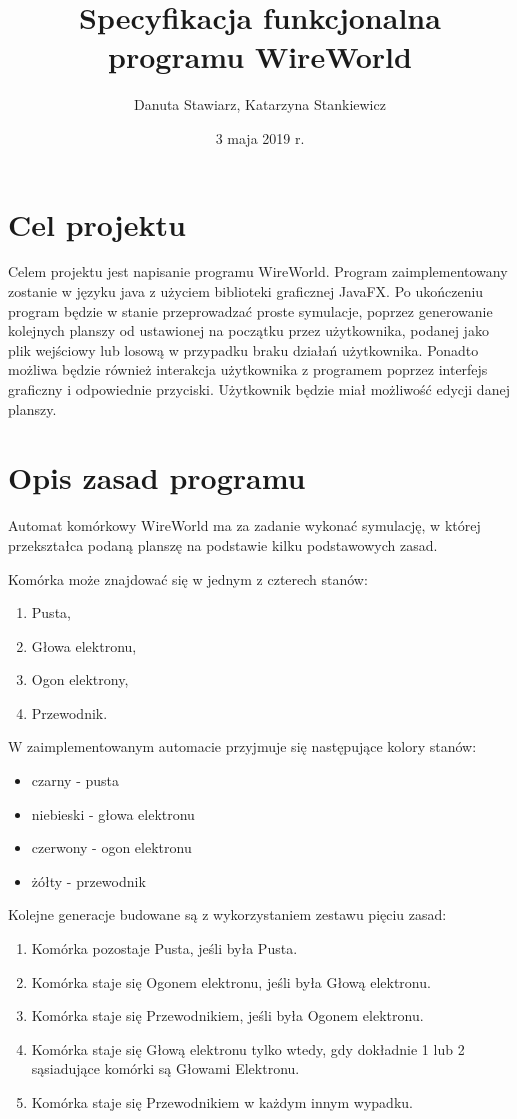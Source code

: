 \documentclass[10pt, oneside]{article}
\title{Specyfikacja funkcjonalna programu WireWorld}
\author{Danuta Stawiarz, Katarzyna Stankiewicz}
\date{3 maja 2019 r.}
\begin{document}
\maketitle
\tableofcontents
\newpage	

\section{Cel projektu}

Celem projektu jest napisanie programu WireWorld. Program zaimplementowany zostanie w języku java z użyciem biblioteki graficznej JavaFX. Po ukończeniu program będzie w stanie przeprowadzać proste symulacje, poprzez generowanie kolejnych planszy od ustawionej na początku przez użytkownika, podanej jako plik wejściowy lub losową w przypadku braku działań użytkownika. Ponadto możliwa będzie również interakcja użytkownika z programem poprzez interfejs graficzny i odpowiednie przyciski. Użytkownik będzie miał możliwość edycji danej planszy. 

\section{Opis zasad programu}

Automat komórkowy WireWorld ma za zadanie wykonać symulację, w której przekształca podaną planszę na podstawie kilku podstawowych zasad.

 Komórka może znajdować się w jednym z czterech stanów:

\begin{enumerate}
\item Pusta,
\item Głowa elektronu,
\item Ogon elektrony,
\item Przewodnik.
\end{enumerate}

W zaimplementowanym automacie przyjmuje się następujące kolory stanów:
\begin{itemize}
\item czarny - pusta
\item niebieski - głowa elektronu
\item czerwony - ogon elektronu
\item żółty - przewodnik
\end{itemize}


Kolejne generacje budowane są z wykorzystaniem zestawu pięciu zasad:
\begin{enumerate}
\item Komórka pozostaje Pusta, jeśli była Pusta.
\item Komórka staje się Ogonem elektronu, jeśli była Głową elektronu.
\item Komórka staje się Przewodnikiem, jeśli była Ogonem elektronu.
\item Komórka staje się Głową elektronu tylko wtedy, gdy dokładnie 1 lub 2 sąsiadujące komórki są Głowami Elektronu.
\item Komórka staje się Przewodnikiem w każdym innym wypadku.
\end{enumerate}
\end{document}
